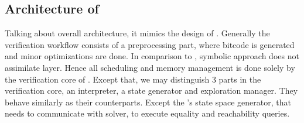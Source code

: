 
\subsection{Architecture of \SymDIVINE}
Talking about \SymDIVINE overall architecture, it mimics the design of \DIVINE.
Generally the verification workflow consists of a preprocessing part, where
\LLVM bitcode is generated and minor optimizations are done. In comparison to
\DIVINE, symbolic approach does not assimilate \DIOS layer. Hence all scheduling
and memory management is done solely by the verification core of \SymDIVINE. Except
that, we may distinguish 3 parts in the verification core, an interpreter, a state
generator and exploration manager. They behave similarly as their \DIVINE
counterparts. Except the \SymDIVINE's state space generator, that needs to
communicate with \SMT solver, to execute equality and reachability queries.

